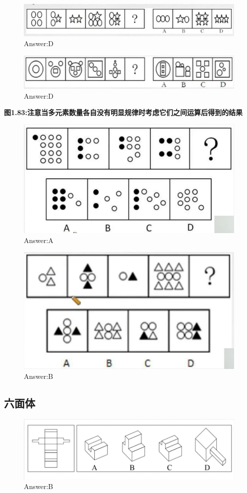 \documentclass{article}
\numberwithin{equation}{section}						%
\numberwithin{figure}{section}							%
\begin{document}
\begin{sloppypar}
\begin{figure}[H]
     \centering
     \includegraphics[width=0.6\linewidth]{85.png}
		\caption{Answer:D}
\end{figure}


\begin{figure}[H]
     \centering
     \includegraphics[width=0.6\linewidth]{86.png}
		\caption{Answer:D}
\end{figure}

\textbf{图1.83:注意当多元素数量各自没有明显规律时考虑它们之间运算后得到的结果}

\begin{figure}[H]
     \centering
     \includegraphics[width=0.6\linewidth]{87.png}
		\caption{Answer:A}
\end{figure}


\begin{figure}[H]
     \centering
     \includegraphics[width=0.6\linewidth]{88.png}
		\caption{Answer:B}
\end{figure}


\subsection{六面体}


\begin{figure}[H]
     \centering
     \includegraphics[width=0.6\linewidth]{89.png}
		\caption{Answer:B}
\end{figure}


\end{sloppypar}
\end{document}
